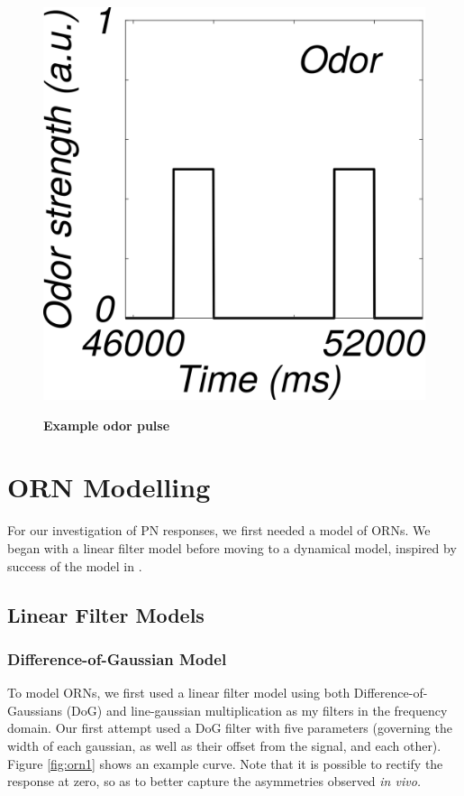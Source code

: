 \documentclass[a4paper,12pt,twoside]{article}
\begin{document}
\begin{figure}
\centering
\caption{\textbf{Example odor pulse} \newline}
\hspace*{-1cm}
\includegraphics[scale=0.7]{2016-08-26_Example_Odor.png}
\label{fig:odor}
\end{figure}


\section{ORN Modelling}
For our investigation of PN responses, we first needed a model of ORNs.  We began with a linear filter model before moving to a dynamical model, inspired by success of the model in \citet{Nagel2011}.
\subsection{Linear Filter Models}
\subsubsection{Difference-of-Gaussian Model}
To model ORNs, we first used a linear filter model using both Difference-of-Gaussians (DoG) and line-gaussian multiplication as my filters in the frequency domain.  Our first attempt used a DoG filter with five parameters (governing the width of each gaussian, as well as their offset from the signal, and each other). Figure \ref{fig:orn1} shows an example curve.  Note that it is possible to rectify the response at zero, so as to better capture the asymmetries observed \textit{in vivo.}
\end{document}
